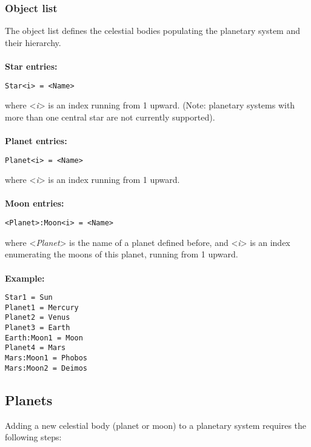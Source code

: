\documentclass[Orbiter Developer Manual.tex]{subfiles}
\begin{document}
\subsubsection*{Object list}
The object list defines the celestial bodies populating the planetary system and their hierarchy.\\
\\
\textbf{Star entries:}

\begin{lstlisting}[language=OSFS]
Star<i> = <Name>
\end{lstlisting}

\noindent
where <\textit{i}> is an index running from 1 upward. (Note: planetary systems with more than one central star are not currently supported).\\
\\
\textbf{Planet entries:}

\begin{lstlisting}[language=OSFS]
Planet<i> = <Name>
\end{lstlisting}

\noindent
where <\textit{i}> is an index running from 1 upward.\\
\\
\textbf{Moon entries:}

\begin{lstlisting}[language=OSFS]
<Planet>:Moon<i> = <Name>
\end{lstlisting}

\noindent
where <\textit{Planet}> is the name of a planet defined before, and <\textit{i}> is an index enumerating the moons of this planet, running from 1 upward.\\
\\
\textbf{Example:}

\begin{lstlisting}[language=OSFS]
Star1 = Sun
Planet1 = Mercury
Planet2 = Venus
Planet3 = Earth
Earth:Moon1 = Moon
Planet4 = Mars
Mars:Moon1 = Phobos
Mars:Moon2 = Deimos
\end{lstlisting}


\subsection{Planets}
\label{ssec:planets}
Adding a new celestial body (planet or moon) to a planetary system requires the following steps:
\end{document}
